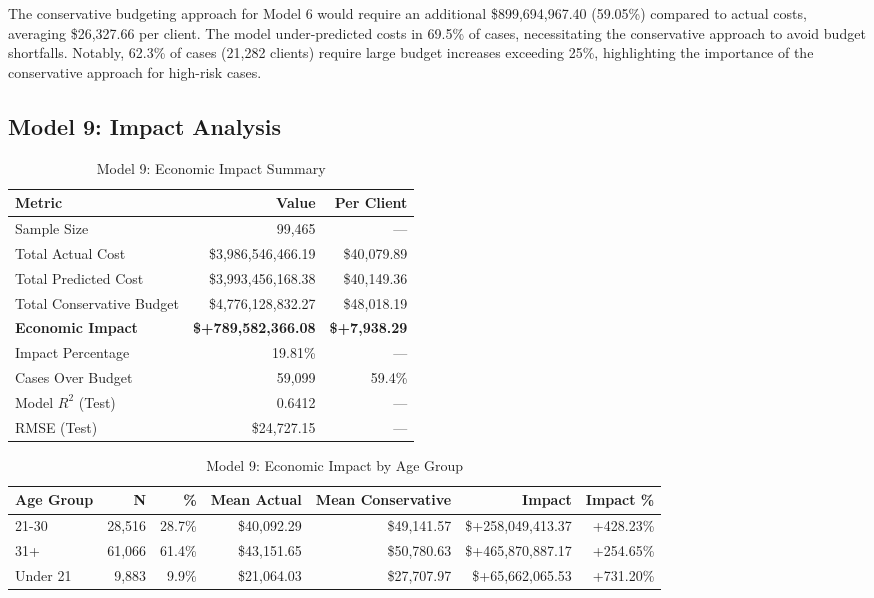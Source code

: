 The conservative budgeting approach for Model 6 would require an additional \$899,694,967.40 (59.05\%) compared to actual costs, averaging \$26,327.66 per client. The model under-predicted costs in 69.5\% of cases, necessitating the conservative approach to avoid budget shortfalls. Notably, 62.3\% of cases (21,282 clients) require large budget increases exceeding 25\%, highlighting the importance of the conservative approach for high-risk cases. 

\clearpage

\subsection{Model 9: Impact Analysis}
\label{subsec:model9_impact}

\begin{table}[htbp]
\centering
\small
\caption{Model 9: Economic Impact Summary}
\label{tab:model9_impact_summary}
\begin{tabular}{lrr}
\toprule
\textbf{Metric} & \textbf{Value} & \textbf{Per Client} \\
\midrule
Sample Size & 99,465 & --- \\
\midrule
Total Actual Cost & \$3,986,546,466.19 & \$40,079.89 \\
Total Predicted Cost & \$3,993,456,168.38 & \$40,149.36 \\
Total Conservative Budget & \$4,776,128,832.27 & \$48,018.19 \\
\midrule
\textbf{Economic Impact} & \textbf{\$+789,582,366.08} & \textbf{\$+7,938.29} \\
Impact Percentage & 19.81\% & --- \\
\midrule
Cases Over Budget & 59,099 & 59.4\% \\
\midrule
Model $R^2$ (Test) & 0.6412 & --- \\
RMSE (Test) & \$24,727.15 & --- \\
\bottomrule
\end{tabular}
\end{table}

\begin{table}[htbp]
\centering
\small
\caption{Model 9: Economic Impact by Age Group}
\label{tab:model9_impact_age}
\begin{tabular}{lrrrrrr}
\toprule
\textbf{Age Group} & \textbf{N} & \textbf{\%} & \textbf{Mean Actual} & \textbf{Mean Conservative} & \textbf{Impact} & \textbf{Impact \%} \\
\midrule
21-30 & 28,516 & 28.7\% & \$40,092.29 & \$49,141.57 & \$+258,049,413.37 & +428.23\% \\
31+ & 61,066 & 61.4\% & \$43,151.65 & \$50,780.63 & \$+465,870,887.17 & +254.65\% \\
Under 21 & 9,883 & 9.9\% & \$21,064.03 & \$27,707.97 & \$+65,662,065.53 & +731.20\% \\
\bottomrule
\end{tabular}
\end{table}

